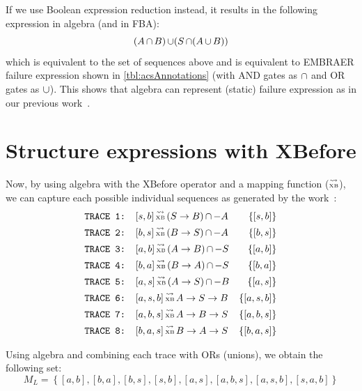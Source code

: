 \documentclass[12pt,openright,twoside,a4paper,oldfontcommands,english,brazil,final]{abntex2}
\theoremstyle{theo}
\newcommand{\EMBRAER}{EMBRAER\xspace}
\def\xbeforeop{\ensuremath\rightarrow}
\newcommand{\xbefore}[2]{\ensuremath #1 \xbeforeop #2 }
\def\tracetoalgebra{\ensuremath\operatorname{\stackrel{\leadsto}{\text{\tiny XB}}}}
\newcommand{\parsin}[1]{\ensuremath\left( #1 \right)}
\def\union{\ensuremath\operatorname{\cup}}
\def\inter{\ensuremath\operatorname{\cap}}
\begin{document}
If we use Boolean expression reduction instead, it results in the following expression in \ac{algebra} (and in \ac{FBA}):
\[
(A \inter B) \union (S \inter (A \union B))
\]
%
which is equivalent to the set of sequences above and is equivalent to \EMBRAER failure expression shown in \cref{tbl:acsAnnotations} (with \ac{AND} gates as $\inter$ and \ac{OR} gates as $\union$).
%
This shows that \ac{algebra} can represent (static) failure expression as in our previous work~\cite{DM2012}.

\section{Structure expressions with \acs*{XBefore}}
\label{sec:case-study-xbefore}

Now, by using \ac{algebra} with the \ac{XBefore} operator and a mapping function ($\tracetoalgebra$), we can capture each possible individual sequences as generated by the work~\cite{DM2012}:
%
\begin{align*}
\text{\texttt{TRACE 1: }}&[s,b] \tracetoalgebra \parsin{\xbefore{S}{B}} \inter -A & \left\{[s,b]\right\}\\
\text{\texttt{TRACE 2: }}&[b,s] \tracetoalgebra \parsin{\xbefore{B}{S}} \inter -A & \left\{[b,s]\right\}\\
\text{\texttt{TRACE 3: }}&[a,b] \tracetoalgebra \parsin{\xbefore{A}{B}} \inter -S & \left\{[a,b]\right\}\\
\text{\texttt{TRACE 4: }}&[b,a] \tracetoalgebra \parsin{\xbefore{B}{A}} \inter -S & \left\{[b,a]\right\}\\
\text{\texttt{TRACE 5: }}&[a,s] \tracetoalgebra \parsin{\xbefore{A}{S}} \inter -B & \left\{[a,s]\right\}\\
\text{\texttt{TRACE 6: }}&[a,s,b] \tracetoalgebra \xbefore{\xbefore{A}{S}}{B} & \left\{[a,s,b]\right\}\\
\text{\texttt{TRACE 7: }}&[a,b,s] \tracetoalgebra \xbefore{\xbefore{A}{B}}{S} & \left\{[a,b,s]\right\}\\
\text{\texttt{TRACE 8: }}&[b,a,s] \tracetoalgebra \xbefore{\xbefore{B}{A}}{S} & \left\{[b,a,s]\right\}
\end{align*}

Using \ac{algebra} and combining each trace with \acp{OR} (unions), we obtain the following set:
%
\[
M_L =
  \left\{
    [a,b],[b,a],[b,s],[s,b],[a,s],
    [a,b,s],[a,s,b],[s,a,b]
  \right\}
\]
\end{document}
